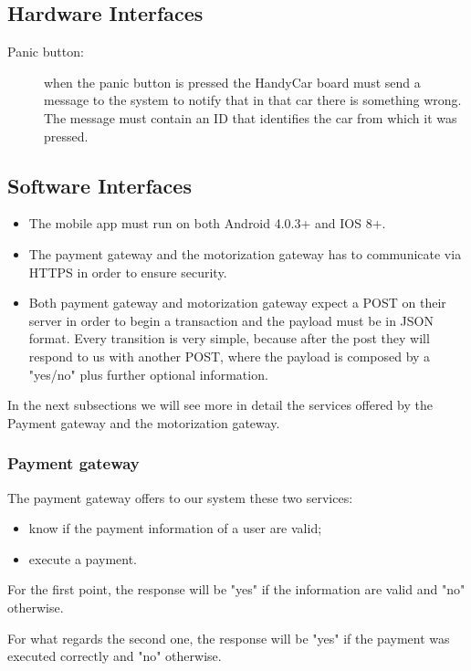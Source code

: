 \subsection{Hardware Interfaces}
\begin{description}
	\item [Panic button:] when the panic button is pressed the HandyCar board must send a message to the system to notify that in that car there is something wrong. The message must contain an ID that identifies the car from which it was pressed.
\end{description}

\subsection{Software Interfaces}
\begin{itemize}
\item The mobile app must run on both Android 4.0.3+ and IOS 8+.
\item The payment gateway and the motorization gateway has to communicate via HTTPS in order to ensure security.
\item Both payment gateway and motorization gateway expect a POST on their server in order to begin a transaction and the payload must be in JSON format. Every transition is very simple, because after the post they will respond to us with another POST, where the payload is composed by a "yes/no" plus further optional information.
\end{itemize}

In the next subsections we will see more in detail the services offered by the Payment gateway and the motorization gateway.

\subsubsection{Payment gateway}
The payment gateway offers to our system these two services:
\begin{itemize}
\item know if the payment information of a user are valid;
\item execute a payment.
\end{itemize}

For the first point, the response will be "yes" if the information are valid and "no" otherwise.

For what regards the second one, the response will be "yes" if the payment was executed correctly and "no" otherwise.


